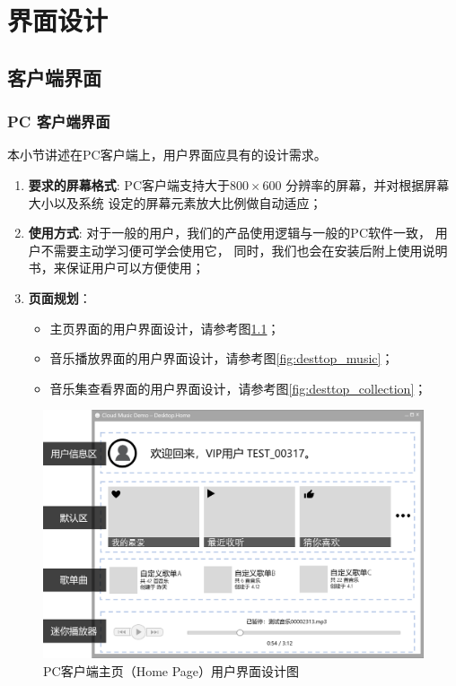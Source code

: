 
\chapter{界面设计}
\section{客户端界面}

\subsection{PC 客户端界面} %
\label{sub:pc_客户端界面}

本小节讲述在PC客户端上，用户界面应具有的设计需求。

\begin{enumerate}
	\item \textbf{要求的屏幕格式}:
		PC客户端支持大于$800 \times 600$ 分辨率的屏幕，并对根据屏幕大小以及系统
		设定的屏幕元素放大比例做自动适应；
	\item \textbf{使用方式}:
		对于一般的用户，我们的产品使用逻辑与一般的PC软件一致，
			用户不需要主动学习便可学会使用它，
		同时，我们也会在安装后附上使用说明书，来保证用户可以方便使用；
	\item \textbf{页面规划}： 
	\begin{itemize}
		\item 主页界面的用户界面设计，请参考图\ref{fig:desttop_home}；
		\item 音乐播放界面的用户界面设计，请参考图\ref{fig:desttop_music}；
		\item 音乐集查看界面的用户界面设计，请参考图\ref{fig:desttop_collection}；
	\end{itemize}
\end{enumerate}

\newpage
\begin{figure}[h!]
  \centering

  \includegraphics[width=.95\linewidth]{figures/desttop_home}

  \caption{  \label{fig:desttop_home}
  		PC客户端主页（Home Page）用户界面设计图
    }
\end{figure}

